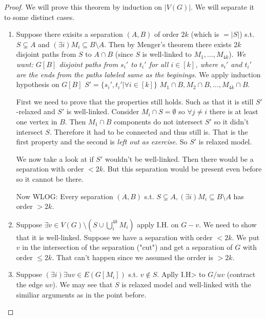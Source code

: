 \begin{proof}
	We will prove this theorem by induction on $|V(G)|$. We will separate it to some distinct cases.
	
	\begin{enumerate}[(1)]
		\item Suppose there exisits a separation $(A,B)$ of order $2k$ (which is $= |S|$) s.t. $S \subsetneq A$ and $(\exists i) M_{i} \subseteq B \setminus A$. Then by Menger's theorem there exists $2k$ disjoint paths from $S$ to $A \cap B$ (since $S$ is well-linked to $M_{1}, \dots, M_{4k}$).\textit{ We want: $G[B]$ disjoint paths from $s_{i}'$ to $t_{i}'$ for all $i \in [k]$, where $s_{i}'$ and $t_{i}'$ are the ends from the paths labeled same as the beginings.} We apply induction hypothesis on $G[B]$ $S' = \{s_{i}', t_{i}' | \forall i \in [k]\}$ $M_{1} \cap B, M_{2} \cap B, \dots, M_{4k} \cap B$.
		
		First we need to prove that the properties still holds. Such as that it is still $S'$-relaxed and $S'$ is well-linked. Consider $M_{i} \cap S = \emptyset$ so $\forall j \neq i$ there is at least one vertex in $B$. Then $M_{1} \cap B$ components do not intersect $S'$ so it didn't intersect $S$. Therefore it had to be connected and thus still is. That is the first property and the second is \textit{left out as exercise}. So $S'$ is relaxed model.
		
		We now take a look at if $S'$ wouldn't be well-linked. Then there would be a separation with order $< 2k$. But this separation would be present even before so it cannot be there.
		
		Now WLOG: Every separation $(A,B)$ s.t. $S \subsetneq A, (\exists i) M_{i} \subseteq B \setminus A$ has order $> 2k$.
		
		\item Suppose $\exists v \in V(G) \setminus (S \cup \bigcup_{i}^{4k} M_{i})$ apply I.H. on $G -v$. We need to show that it is well-linked. Suppose we have a separation with order $<2k$. We put $v$ in the intersection of the separation ("cut") and get a separation of $G$ with order $\leq 2k$. That can't happen since we assumed the orrder is $>2k$.
		
		\item Suppose $(\exists i) \exists uv \in E(G[M_{i}])$ s.t. $v \notin S$. Aplly I.H> to $G / uv$ (contract the edge $uv$). We may see that $S$ is relaxed model and well-linked with the similiar arguments as in the point before.
	\end{enumerate}
	

\end{proof}

